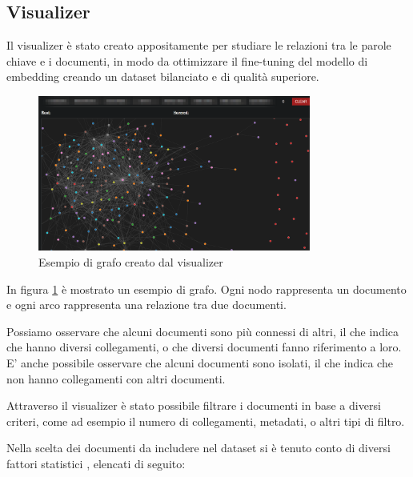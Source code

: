 \subsection{Visualizer}
\label{sec:visualizer}
Il visualizer è stato creato appositamente per studiare le
relazioni tra le parole chiave e i documenti, in modo da
ottimizzare il fine-tuning del modello di embedding creando
un dataset bilanciato e di qualità superiore.

\begin{figure}[H]
      \centering
      \includegraphics[width=0.8\textwidth]{res/vis1.png}
      \caption{Esempio di grafo creato dal visualizer}
      \label{fig:vis1}
\end{figure}

In figura \ref{fig:vis1} è mostrato un esempio di grafo.
Ogni nodo rappresenta un documento e ogni arco rappresenta
una relazione tra due documenti.

Possiamo osservare che alcuni documenti sono più connessi
di altri, il che indica che hanno diversi collegamenti, o
che diversi documenti fanno riferimento a loro.
E' anche possibile osservare che alcuni documenti sono
isolati, il che indica che non hanno collegamenti con altri
documenti.

Attraverso il visualizer è stato possibile filtrare i
documenti in base a diversi criteri, come ad esempio il
numero di collegamenti, metadati, o altri tipi di filtro.

Nella scelta dei documenti da includere nel dataset si è tenuto
conto di diversi fattori statistici \cite{Newman2010}
\cite{Newman2002Assortative} \cite{Newman2003Mixing},
elencati di seguito:

